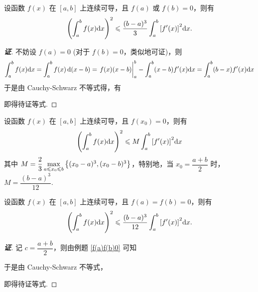 \begin{example}
    \label{f(a)f(b)0}设函数 $f(x)$ 在 $[a,b]$ 上连续可导，且 $f(a)$ 或 $f(b)=0$，则有
    $$\qty(\int_{a}^{b}f(x)\dd x)^2\leqslant \dfrac{(b-a)^3}{3}\int_{a}^{b}\qty[f'(x)]^2 \dd x.$$
\end{example}
\begin{proof}[{\songti \textbf{证}}]
    不妨设 $f(a)=0$ (对于 $f(b)=0$，类似地可证)，则
    $$\int_{a}^{b}f(x)\dd x=\int_{a}^{b}f(x)\dd (x-b)=\eval{f(x)(x-b)}_{a}^{b}-\int_{a}^{b}(x-b)f'(x)\dd x=\int_{a}^{b}(b-x)f'(x)\dd x$$
    于是由 Cauchy-Schwarz 不等式得，有
    即得待证等式.
\end{proof}
\begin{inference}
    设函数 $f(x)$ 在 $[a,b]$ 上连续可导，且 $f(x_0)=0$，则有
    $$\qty(\int_{a}^{b}f(x)\dd x)^2\leqslant M\int_{a}^{b}\qty[f'(x)]^2 \dd x$$
    其中 $M=\dfrac{2}{3}\max\limits_{a\leqslant x_0\leqslant b}\qty{(x_0-a)^3,(x_0-b)^3}$，特别地，当 $x_0=\dfrac{a+b}{2}$ 时，$M=\dfrac{(b-a)^3}{12}.$
\end{inference}

\begin{example}
    设函数 $f(x)$ 在 $[a,b]$ 上连续可导，且 $f(a)=f(b)=0$，则有
    $$\qty(\int_{a}^{b}f(x)\dd x)^2\leqslant \dfrac{(b-a)^3}{12}\int_{a}^{b}\qty[f'(x)]^2 \dd x.$$
\end{example}
\begin{proof}[{\songti \textbf{证}}]
    记 $c=\dfrac{a+b}{2}$，则由例题 \ref{f(a)f(b)0} 可知
    于是由 Cauchy-Schwarz 不等式，
    即得待证等式.
\end{proof}

